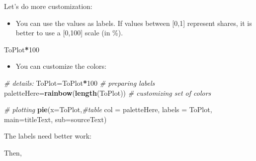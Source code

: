 \documentclass[]{article}
\newenvironment{Shaded}{\begin{snugshade}}{\end{snugshade}}
\newcommand{\KeywordTok}[1]{\textcolor[rgb]{0.13,0.29,0.53}{\textbf{#1}}}
\newcommand{\DataTypeTok}[1]{\textcolor[rgb]{0.13,0.29,0.53}{#1}}
\newcommand{\DecValTok}[1]{\textcolor[rgb]{0.00,0.00,0.81}{#1}}
\newcommand{\StringTok}[1]{\textcolor[rgb]{0.31,0.60,0.02}{#1}}
\newcommand{\CommentTok}[1]{\textcolor[rgb]{0.56,0.35,0.01}{\textit{#1}}}
\newcommand{\OperatorTok}[1]{\textcolor[rgb]{0.81,0.36,0.00}{\textbf{#1}}}
\newcommand{\NormalTok}[1]{#1}
\providecommand{\tightlist}{%
  \setlength{\itemsep}{0pt}\setlength{\parskip}{0pt}}
\begin{document}
Let's do more customization:

\begin{itemize}
\tightlist
\item
  You can use the values as labels. If values between {[}0,1{]}
  represent shares, it is better to use a {[}0,100{]} scale (in \%).
\end{itemize}

\begin{Shaded}
\begin{Highlighting}[]
\NormalTok{ToPlot}\OperatorTok{*}\DecValTok{100}
\end{Highlighting}
\end{Shaded}

\begin{itemize}
\tightlist
\item
  You can customize the colors:
\end{itemize}

\begin{Shaded}
\begin{Highlighting}[]
\CommentTok{# details:}
\NormalTok{ToPlot=ToPlot}\OperatorTok{*}\DecValTok{100} \CommentTok{# preparing labels}
\NormalTok{paletteHere=}\KeywordTok{rainbow}\NormalTok{(}\KeywordTok{length}\NormalTok{(ToPlot)) }\CommentTok{# customizing set of colors}

\CommentTok{# plotting}
\KeywordTok{pie}\NormalTok{(}\DataTypeTok{x=}\NormalTok{ToPlot,}\CommentTok{#table}
    \DataTypeTok{col =}\NormalTok{ paletteHere, }
    \DataTypeTok{labels =}\NormalTok{ ToPlot,}
    \DataTypeTok{main=}\NormalTok{titleText,}
    \DataTypeTok{sub=}\NormalTok{sourceText)}
\end{Highlighting}
\end{Shaded}

The labels need better work:

\begin{Shaded}
\end{Shaded}

Then,

\begin{Shaded}
\end{Shaded}
\end{document}
